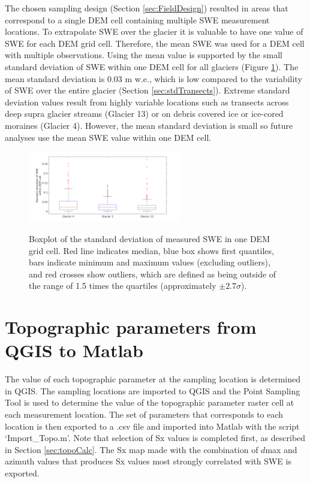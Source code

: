 \documentclass{sfuthesis}
\newcommand{\boxMatlab}{Red line indicates median, blue box shows first quantiles, bars indicate minimum and maximum values (excluding outliers), and red crosses show outliers, which are defined as being outside of the range of 1.5 times the quartiles (approximately $\pm2.7\sigma$). }
\begin{document}
\begin{appendices}
The chosen sampling design (Section \ref{sec:FieldDesign}) resulted in areas that correspond to a single DEM cell containing multiple SWE measurement locations. To extrapolate SWE over the glacier it is valuable to have one value of SWE for each DEM grid cell. Therefore, the mean SWE was used for a DEM cell with multiple observations. Using the mean value is supported by the small standard deviation of SWE within one DEM cell for all glaciers (Figure \ref{fig:DEMcellSTD}). The mean standard deviation is 0.03 m w.e., which is low compared to the variability of SWE over the entire glacier (Section \ref{sec:stdTransects}). Extreme standard deviation values result from highly variable locations such as transects across deep supra glacier streams (Glacier 13) or on debris covered ice or ice-cored moraines (Glacier 4). However, the mean standard deviation is small so future analyses use the mean SWE value within one DEM cell. 

\begin{figure}[H]
	\centering
	\includegraphics[width = 0.6\textwidth]{DEMcellSTD.png}\\
	\caption{Boxplot of the standard deviation of measured SWE in one DEM grid cell. \boxMatlab}
	\label{fig:DEMcellSTD}
\end{figure}


\chapter{Topographic parameters from QGIS to Matlab}

The value of each topographic parameter at the sampling location is determined in QGIS. The sampling locations are imported to QGIS and the Point Sampling Tool is used to determine the value of the topographic parameter raster cell at each measurement location. The set of parameters that corresponds to each location is then exported to a .csv file and imported into Matlab with the script `Import\_Topo.m'. Note that selection of Sx values is completed first, as described in Section \ref{sec:topoCalc}. The Sx map made with the combination of $d$max and azimuth values that produces Sx values most strongly correlated with SWE is exported.


\end{appendices}
\end{document}
